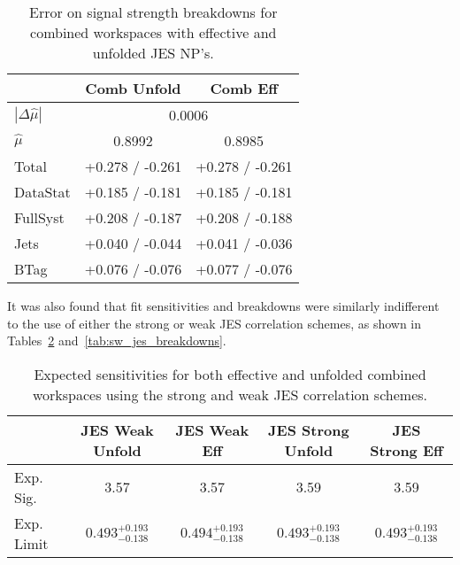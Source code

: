 \begin{table}[!htbp]\captionsetup{justification=centering}
\begin{center}\begin{tabular}{lcc}
\hline\hline
 & Comb Unfold & Comb Eff\\
\hline
$\left|\Delta\hat{\mu}\right|$ &  \multicolumn{2}{c}{0.0006}\\
$\hat{\mu}$ & 0.8992 & 0.8985\\
\hline
Total &  +0.278 / -0.261  &  +0.278 / -0.261 \\
DataStat &  +0.185 / -0.181  &  +0.185 / -0.181 \\
FullSyst &  +0.208 / -0.187  &  +0.208 / -0.188 \\
\hline
Jets &  +0.040 / -0.044  &  +0.041 / -0.036 \\
BTag &  +0.076 / -0.076  &  +0.077 / -0.076 \\
\hline
\hline
\end{tabular}
\caption{Error on signal strength breakdowns for combined workspaces with effective and unfolded JES NP's.}
\label{tab:unfold_jes_breakdownsc}
\end{center}
\end{table}

It was also found that fit sensitivities and breakdowns were similarly indifferent to the use of either the strong or weak JES correlation schemes, as shown in Tables~\ref{tab:sw_jes_sensitivities} and~\ref{tab:sw_jes_breakdowns}.

\begin{table}[!htbp]\captionsetup{justification=centering}
\begin{center}\begin{tabular}{lcccc}
\hline\hline
 & JES Weak Unfold & JES Weak Eff & JES Strong Unfold & JES Strong Eff\\
\hline
Exp. Sig. & 3.57 & 3.57 & 3.59 & 3.59\\
\hline
Exp. Limit & $0.493^{+0.193}_{-0.138}$ & $0.494^{+0.193}_{-0.138}$ & $0.493^{+0.193}_{-0.138}$ & $0.493^{+0.193}_{-0.138}$\\
\hline\hline
\end{tabular}
\caption{Expected sensitivities for both effective and unfolded combined workspaces using the strong and weak JES correlation schemes.}
\label{tab:sw_jes_sensitivities}
\end{center}
\end{table}

